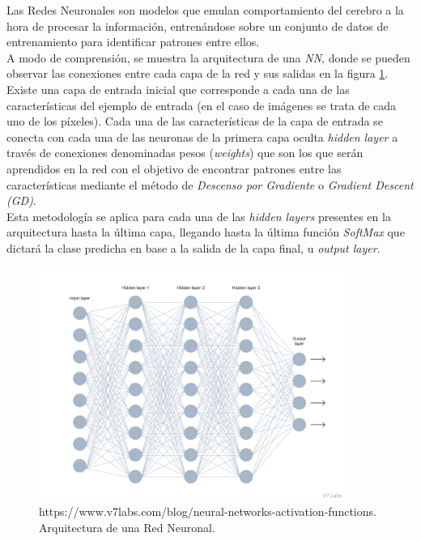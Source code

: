             Las Redes Neuronales \cite{NNReview} son modelos que emulan comportamiento del cerebro a la hora de procesar la información, entrenándose sobre un conjunto de datos de entrenamiento para identificar patrones entre ellos.\\

            A modo de comprensión, se muestra la arquitectura de una \textit{NN}, donde se pueden observar las conexiones entre cada capa de la red y sus salidas en la figura \ref{NNImage}. Existe una capa de entrada inicial que corresponde a cada una de las características del ejemplo de entrada (en el caso de imágenes se trata de cada uno de los píxeles). Cada una de las características de la capa de entrada se conecta con cada una de las neuronas de la primera capa oculta \textit{hidden layer} a través de conexiones denominadas pesos (\textit{weights}) que son los que serán aprendidos en la red con el objetivo de encontrar patrones entre las características mediante el método de \textit{Descenso por Gradiente} o \textit{Gradient Descent (GD)}.\\


            Esta metodología se aplica para cada una de las \textit{hidden layers} presentes en la arquitectura hasta la última capa, llegando hasta la última función \textit{SoftMax} que dictará la clase predicha en base a la salida de la capa final, u \textit{output layer}.\\

            \begin{figure}[h]
                \centering
                \includegraphics[width=10cm]{archivos/3.Tecnologias/RedesNeuronales/NNImage}
                \caption{https://www.v7labs.com/blog/neural-networks-activation-functions. Arquitectura de una Red Neuronal.}
                \label{NNImage}
             \end{figure}




